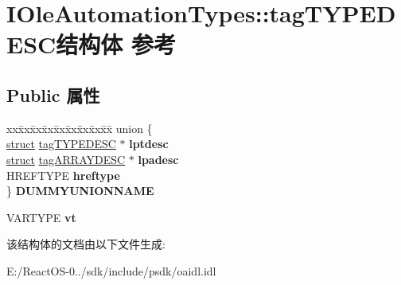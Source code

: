 \hypertarget{struct_i_ole_automation_types_1_1tag_t_y_p_e_d_e_s_c}{}\section{I\+Ole\+Automation\+Types\+:\+:tag\+T\+Y\+P\+E\+D\+E\+S\+C结构体 参考}
\label{struct_i_ole_automation_types_1_1tag_t_y_p_e_d_e_s_c}
\subsection*{Public 属性}
\begin{DoxyCompactItemize}
\item 
\mbox{\label{struct_i_ole_automation_types_1_1tag_t_y_p_e_d_e_s_c_acec41975d469756d7b4e40c44b337882}} 
\begin{tabbing}
xx\=xx\=xx\=xx\=xx\=xx\=xx\=xx\=xx\=\kill
union \{\\
\>\hyperlink{interfacestruct}{struct} \hyperlink{struct_i_ole_automation_types_1_1tag_t_y_p_e_d_e_s_c}{tagTYPEDESC} $\ast$ {\bfseries lptdesc}\\
\>\hyperlink{interfacestruct}{struct} \hyperlink{struct_i_ole_automation_types_1_1tag_a_r_r_a_y_d_e_s_c}{tagARRAYDESC} $\ast$ {\bfseries lpadesc}\\
\>HREFTYPE {\bfseries hreftype}\\
\} {\bfseries DUMMYUNIONNAME}\\

\end{tabbing}\item 
\mbox{\label{struct_i_ole_automation_types_1_1tag_t_y_p_e_d_e_s_c_a2babd1c3e6a418060631db5a33402233}} 
V\+A\+R\+T\+Y\+PE {\bfseries vt}
\end{DoxyCompactItemize}


该结构体的文档由以下文件生成\+:\begin{DoxyCompactItemize}
\item 
E\+:/\+React\+O\+S-\/0../sdk/include/psdk/oaidl.\+idl\end{DoxyCompactItemize}
